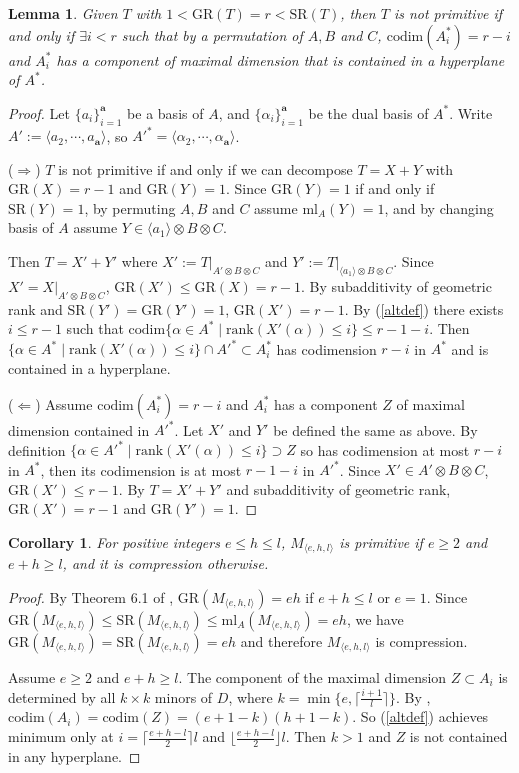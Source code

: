 \documentclass[10pt]{article} %
\newcommand{\aaa}{\mathbf{a}}
\newcommand{\GR}{\mathrm{GR}}
\newcommand{\SR}{\mathrm{SR}}
\newcommand{\ml}{\mathrm{ml}}
\newcommand{\ot}{\otimes}
\newtheorem{lem}[thm]{Lemma}
\newtheorem{cor}[thm]{Corollary}
\theoremstyle{definition}
\begin{document}
\begin{lem}\label{primitivelem}
Given $T$ with $1<\GR(T)=r<\SR(T)$, then $T$ is not primitive if and only if $\exists i< r$ such that by a permutation of $A,B$ and $C$, $\mathrm{codim}(A^*_i)=r-i$ and $A^*_i$ has a component of maximal dimension that is contained in a hyperplane of $A^*$.
\end{lem}
\begin{proof}
Let $\{a_i\}_{i=1}^{\aaa}$ be a basis of $A$, and $\{\alpha_i\}_{i=1}^{\aaa}$ be the dual basis of $A^*$. Write $A':=\langle a_2,\cdots,a_\aaa\rangle$, so $A'^*=\langle \alpha_2,\cdots,\alpha_\aaa\rangle$.

($\Rightarrow$) $T$ is not primitive if and only if we can decompose $T=X+Y$ with $\GR(X)=r-1$ and $\GR(Y)=1$. Since $\GR(Y)=1$ if and only if $\SR(Y)=1$,  by permuting $A,B$ and $C$ assume $\ml_A(Y)=1$, and by changing basis of $A$ assume $Y\in \langle a_1\rangle\ot B\ot C$. 

Then $T=X'+Y'$ where $X':=T|_{A'\ot B\ot C}$ and $Y':=T|_{\langle a_1\rangle\ot B\ot C}$. Since $X'=X|_{A'\ot B\ot C}$, $\GR(X')\leq \GR(X)=r-1$. By subadditivity of geometric rank and $\SR(Y')=\GR(Y')=1$, $\GR(X')=r-1$. By (\ref{altdef}) there exists $i\leq r-1$ such that $\mathrm{codim}\{\alpha\in A^*\mid  \mathrm{rank}(X'(\alpha))\leq i\}\leq r-1-i$. Then $\{\alpha\in A^*\mid  \mathrm{rank}(X'(\alpha))\leq i\}\cap A'^*\subset A^*_i$ has codimension $r-i$ in $A^*$ and is contained in a hyperplane.

($\Leftarrow$) Assume $\mathrm{codim}(A^*_i)=r-i$ and $A^*_i$ has a component $Z$ of maximal dimension contained in $A'^*$. Let $X'$ and $Y'$ be defined the same as above. By definition $\{\alpha\in A'^*\mid  \mathrm{rank}(X'(\alpha))\leq i\}\supset Z$ so has codimension at most $r-i$ in $A^*$, then its codimension is at most $r-1-i$ in $A'^*$. Since $X'\in A'\ot B\ot C$, $\GR(X')\leq r-1$. By $T=X'+Y'$ and subadditivity of geometric rank, $\GR(X')=r-1$ and $\GR(Y')=1$.
\end{proof}


\begin{cor}\label{MMprimitive}
For positive integers $e\leq h\leq l$, $M_{\langle e,h,l \rangle}$ is primitive if $e\geq 2$ and $e+h\geq l$, and it is compression otherwise.
\end{cor}
\begin{proof}
By Theorem 6.1 of \cite{KMZ20}, $\GR(M_{\langle e,h,l \rangle})=eh$ if $e+h\leq l$ or $e=1$. Since $\GR(M_{\langle e,h,l \rangle})\leq \SR(M_{\langle e,h,l \rangle})\leq \ml_A(M_{\langle e,h,l \rangle})=eh$, we have $\GR(M_{\langle e,h,l \rangle})=\SR(M_{\langle e,h,l \rangle})=eh$ and therefore $M_{\langle e,h,l \rangle}$ is compression.

Assume $e\geq 2$ and $e+h\geq l$. The component of the maximal dimension $Z\subset A_i$ is determined by all $k\times k$ minors of $D$, where $k=\min\{e,\lceil \frac{i+1}{l}\rceil\}$. By \cite[Theorem~2.1]{Eis88}, $\mathrm{codim}(A_i)=\mathrm{codim}(Z)=(e+1-k)(h+1-k)$. So (\ref{altdef}) achieves minimum only at $i=\lceil\frac{e+h-l}{2}\rceil l$ and $\lfloor\frac{e+h-l}{2}\rfloor l$. Then $k>1$ and $Z$ is not contained in any hyperplane.
\end{proof}
\end{document}
